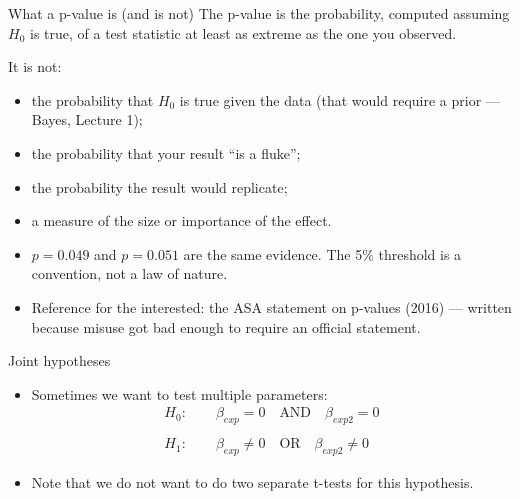 \documentclass[aspectratio=169,11pt]{beamer}
\begin{document}
\begin{frame}{What a p-value is (and is not)}
The \alert{p-value} is the probability, \alert{computed assuming $H_0$ is true}, of a
test statistic at least as extreme as the one you observed.
\bigskip

It is \alert{not}:
\begin{itemize}
	\item the probability that $H_0$ is true given the data (that would require a prior --- Bayes, Lecture 1);
	\item the probability that your result ``is a fluke'';
	\item the probability the result would replicate;
	\item a measure of the \alert{size} or \alert{importance} of the effect.
\end{itemize}
\bigskip
\begin{itemize}
	\item $p = 0.049$ and $p = 0.051$ are the same evidence. The 5\% threshold is a
	convention, not a law of nature.
	\item Reference for the interested: the ASA statement on p-values (2016) ---
	written because misuse got bad enough to require an official statement.
\end{itemize}
\end{frame}



\begin{frame}{Joint hypotheses}
\begin{itemize}
	\item Sometimes we want to test multiple parameters:\[
\begin{array}{c}
H_{0}:\qquad\beta_{exp}=0\quad\text{AND}\quad\beta_{exp2}=0\\
\\
H_{1}:\qquad\beta_{exp}\ne0\quad\text{OR}\quad\beta_{exp2}\ne0
\end{array}
\]

	\item Note that we do not want to do two separate t-tests for this hypothesis. 
\end{itemize}
\end{frame}
\end{document}
